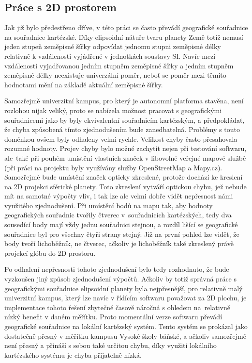 \documentclass[czech, bachelor]{diploma}
\begin{document}
\subsection{Práce s 2D prostorem} \label{cartesian-coordinates}

Jak již bylo předestřeno dříve, v této práci se často převádí geografické souřadnice na souřadnice kartézské. Díky elipsoidní
nátuře tvaru planety Země totiž nemusí jeden stupeň zeměpisné šířky odpovídat jednomu stupni zeměpisné délky relativně
k vzdálenosti vyjádřené v jednotkách soustavy SI. Navíc mezi vzdáleností vyjadřovanou jedním stupněm zeměpisné šířky a jedním
stupněm zeměpisné délky neexistuje univerzální poměr, neboť se poměr mezi těmito hodnotami mění na základě aktuální zeměpisné
šířky.

Samozřejmě univerzitní kampus, pro který je autonomní platforma stavěna, není rozlohou nijak veliký, proto se nabízela možnost
pracovat s geografickými souřadnicemi jako by byly ekvivalentní souřadnicím kartézským, a předpokládat, že chyba způsobená tímto
zjednodušením bude zanedbatelná. Problémy s touto doměnkou ovšem byly odhaleny velmi rychle. Velikost chyby často přesahovala
rozumné hodnoty. Projev chyby bylo možné zachytit nejen při testování softwaru, ale~také při pouhém umístění vlastních značek
v libovolné veřejné mapové službě (při práci na projektu byly využívány služby OpenStreetMap a Mapy.cz). Samozřejmě bude umístění
značek opticky zkreslené, protože dochází ke kreslení na 2D projekci sférické planety. Toto zkreslení vytváří optickou chybu, jež
nebude mít na samotné výpočty vliv, i tak lze ale velmi dobře vidět nepřesnost námi využitého zjednodušení. Při umístění bodů
na mapu tak, aby hodnoty geografických souřadnic tvořily čtverec v~souřadnicích kartézských, tedy dva sousedící body mají vždy
jednu souřadnici stejnou, a rozdíl lišící se geografické souřadnice byl pro všechny čtyři strany stejný. Již na první pohled lze
vidět, že body tvoří lichoběžník, ne čtverec, ačkoliv je lichoběžník také zkreslený právě projekcí glóbu do 2D prostoru.

Po odhalení nepřesnosti tohoto zjednodušení bylo tedy rozhodnuto, že bude vyzkoušen jiný způsob zjednodušení výpočtů. Ačkoliv by
totiž správná práce s geografickými souřadnice elipsoidní planety byla nejpřesnější, pro relativně malý univerzitní kampus, který
lze navíc v řídícím softwaru považovat za 2D plochu, je implementace tohoto řešení zbytečně časově náročná s ohledem na~relativně
nízký benefit v daném měřítku. Proto momentální verze softwaru převádí geografické souřadnice na lokální kartézský systém. Tento
systém se prokázal jako dostatečně přesný v měřítku kampusu Vysoké školy báňské, a ačkoliv samozřejmě není přesný a přináší
s sebou také určitou chybu, díky využití lokálního kartézského systému je chyba přijatelně nízká.
\end{document}
